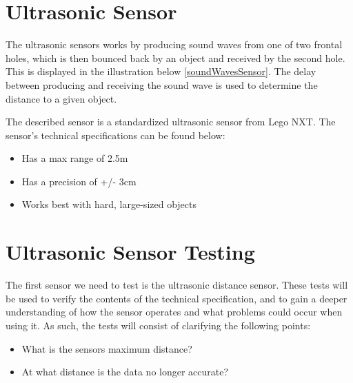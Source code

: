 \section{Ultrasonic Sensor}\label{SensTheoUltra}
The ultrasonic sensors works by producing sound waves from
one of two frontal holes, which is then bounced back by an object and received
by the second hole. This is displayed in the illustration below
\autoref{soundWavesSensor}.
The delay between producing and receiving the sound wave is used to determine the
distance to a given object.


The described sensor is a standardized ultrasonic sensor from Lego NXT. The
sensor's technical specifications \citep{Ultrasonic_sensor} can be found below:
\begin{itemize}
  \item Has a max range of 2.5m
  \item Has a precision of +/- 3cm
  \item Works best with hard, large-sized objects
\end{itemize}


\section{Ultrasonic Sensor Testing}\label{SensorTest}
The first sensor we need to test is the ultrasonic distance sensor. These tests
will be used to verify the contents of the technical specification, and
to gain a deeper understanding of how the sensor operates and what
problems could occur when using it. As such, the tests will consist of
clarifying the following points:
\begin{itemize}
  \item What is the sensors maximum distance?
  \item At what distance is the data no longer accurate?
\end{itemize}

